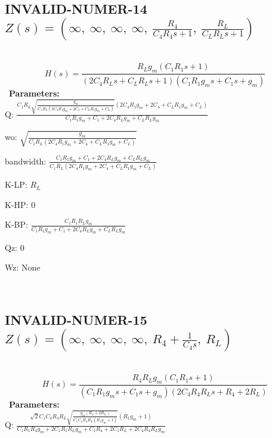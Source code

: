 \documentclass{article}
\begin{document}
\ 

\subsection{INVALID-NUMER-14 $Z(s) = \left( \infty, \  \infty, \  \infty, \  \infty, \  \frac{R_{4}}{C_{4} R_{4} s + 1}, \  \frac{R_{L}}{C_{L} R_{L} s + 1}\right)$ } \ 
\textbf{\[H(s) = \frac{R_{L} g_{m} \left(C_{1} R_{1} s + 1\right)}{\left(2 C_{4} R_{L} s + C_{L} R_{L} s + 1\right) \left(C_{1} R_{1} g_{m} s + C_{1} s + g_{m}\right)}\] } \ 
\textbf{Parameters:}\\ 

Q: $\frac{C_{1} R_{L} \sqrt{\frac{g_{m}}{C_{1} R_{L} \left(2 C_{4} R_{1} g_{m} + 2 C_{4} + C_{L} R_{1} g_{m} + C_{L}\right)}} \left(2 C_{4} R_{1} g_{m} + 2 C_{4} + C_{L} R_{1} g_{m} + C_{L}\right)}{C_{1} R_{1} g_{m} + C_{1} + 2 C_{4} R_{L} g_{m} + C_{L} R_{L} g_{m}}$\ 

wo: $\sqrt{\frac{g_{m}}{C_{1} R_{L} \left(2 C_{4} R_{1} g_{m} + 2 C_{4} + C_{L} R_{1} g_{m} + C_{L}\right)}}$\ 

bandwidth: $\frac{C_{1} R_{1} g_{m} + C_{1} + 2 C_{4} R_{L} g_{m} + C_{L} R_{L} g_{m}}{C_{1} R_{L} \left(2 C_{4} R_{1} g_{m} + 2 C_{4} + C_{L} R_{1} g_{m} + C_{L}\right)}$\ 

K-LP: $R_{L}$\ 

K-HP: $0$\ 

K-BP: $\frac{C_{1} R_{1} R_{L} g_{m}}{C_{1} R_{1} g_{m} + C_{1} + 2 C_{4} R_{L} g_{m} + C_{L} R_{L} g_{m}}$\ 

Qz: $0$\ 

Wz: $\text{None}$\ 

\ 

\subsection{INVALID-NUMER-15 $Z(s) = \left( \infty, \  \infty, \  \infty, \  \infty, \  R_{4} + \frac{1}{C_{4} s}, \  R_{L}\right)$ } \ 
\textbf{\[H(s) = \frac{R_{4} R_{L} g_{m} \left(C_{1} R_{1} s + 1\right)}{\left(C_{1} R_{1} g_{m} s + C_{1} s + g_{m}\right) \left(2 C_{4} R_{4} R_{L} s + R_{4} + 2 R_{L}\right)}\] } \ 
\textbf{Parameters:}\\ 

Q: $\frac{\sqrt{2} C_{1} C_{4} R_{4} R_{L} \sqrt{\frac{g_{m} \left(R_{4} + 2 R_{L}\right)}{C_{1} C_{4} R_{4} R_{L} \left(R_{1} g_{m} + 1\right)}} \left(R_{1} g_{m} + 1\right)}{C_{1} R_{1} R_{4} g_{m} + 2 C_{1} R_{1} R_{L} g_{m} + C_{1} R_{4} + 2 C_{1} R_{L} + 2 C_{4} R_{4} R_{L} g_{m}}$\ 
\end{document}
